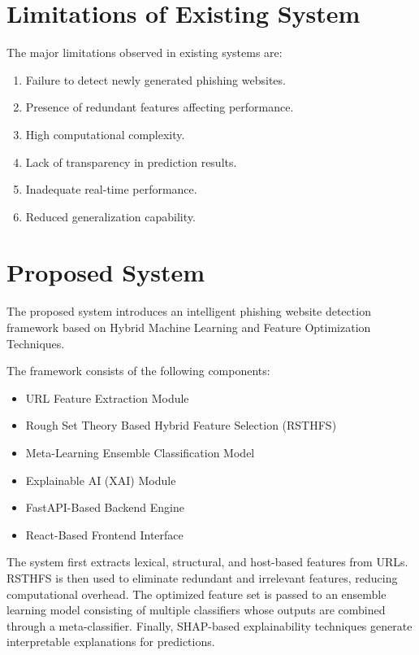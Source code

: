 \documentclass[12pt]{report}
\begin{document}
\section{Limitations of Existing System}

The major limitations observed in existing systems are:

\begin{enumerate}
    \item Failure to detect newly generated phishing websites.
    \item Presence of redundant features affecting performance.
    \item High computational complexity.
    \item Lack of transparency in prediction results.
    \item Inadequate real-time performance.
    \item Reduced generalization capability.
\end{enumerate}

\section{Proposed System}

The proposed system introduces an intelligent phishing website detection framework based on Hybrid Machine Learning and Feature Optimization Techniques.

The framework consists of the following components:

\begin{itemize}
    \item URL Feature Extraction Module
    \item Rough Set Theory Based Hybrid Feature Selection (RSTHFS)
    \item Meta-Learning Ensemble Classification Model
    \item Explainable AI (XAI) Module
    \item FastAPI-Based Backend Engine
    \item React-Based Frontend Interface
\end{itemize}

The system first extracts lexical, structural, and host-based features from URLs. RSTHFS is then used to eliminate redundant and irrelevant features, reducing computational overhead. The optimized feature set is passed to an ensemble learning model consisting of multiple classifiers whose outputs are combined through a meta-classifier. Finally, SHAP-based explainability techniques generate interpretable explanations for predictions.
\end{document}
